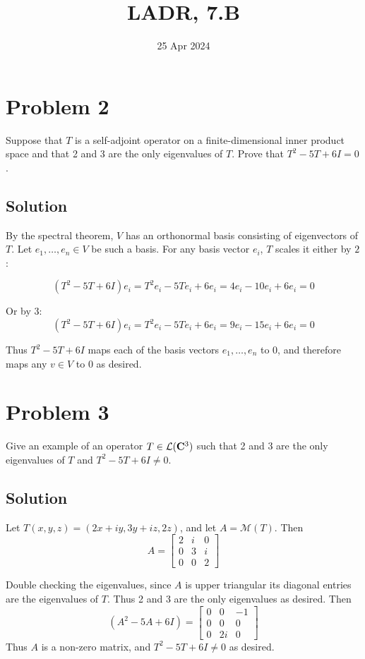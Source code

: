 \documentclass{article}
\title{LADR, 7.B}
\date{25 Apr 2024}
\begin{document}
\maketitle

\section*{Problem 2}
Suppose that $T$ is a self-adjoint operator on a finite-dimensional inner product space and that 2 and 3 are the only eigenvalues of $T$. Prove that $T^2-5T+6I=0$.

\subsection*{Solution}
By the spectral theorem, $V$ has an orthonormal basis consisting of eigenvectors of $T$. Let $e_1, \ldots, e_n\in V$ be such a basis. For any basis vector $e_i$, $T$ scales it either by $2$:

\[(T^2-5T+6I)e_i=T^2e_i-5Te_i+6e_i=4e_i-10e_i+6e_i=0\]

Or by $3$:
\[(T^2-5T+6I)e_i=T^2e_i-5Te_i+6e_i=9e_i-15e_i+6e_i=0\]

Thus $T^2-5T+6I$ maps each of the basis vectors $e_1, \ldots, e_n$ to $0$, and therefore maps any $v\in V$ to $0$ as desired.

\section*{Problem 3}
Give an example of an operator $T\in\mathcal{L}(\mathbf{C}^3)$ such that 2 and 3 are the only eigenvalues of $T$ and $T^2-5T+6I\neq0$.

\subsection*{Solution}
Let $T(x,y,z)=(2x + iy, 3y + iz, 2z)$, and let $A=\mathcal{M}(T)$. Then
\[A=\begin{bmatrix}
    2 & i & 0 \\
    0 & 3 & i \\
    0 & 0 & 2
\end{bmatrix}\]

Double checking the eigenvalues, since $A$ is upper triangular its diagonal entries are the eigenvalues of $T$. Thus 2 and 3 are the only eigenvalues as desired. Then
\[(A^2-5A+6I)=\begin{bmatrix}
    0 & 0 & -1 \\
    0 & 0 & 0 \\
    0 & 2i & 0
\end{bmatrix}\]
Thus $A$ is a non-zero matrix, and $T^2-5T+6I\neq0$ as desired.
\end{document}
